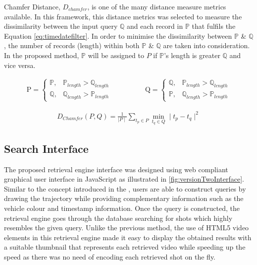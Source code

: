 Chamfer Distance, $D_{chamfer}$, is one of the many distance measure metrics available. In this framework, this distance metrics was selected to measure the dissimilarity between the input query $\mathbb{Q}$ and each record in $\mathbb{P}$ that fulfils the Equation \ref{eq:timedatefilter}. In order to minimise the dissimilarity between $\mathbb{P}$ \& $\mathbb{Q}$, the number of records (length) within both $\mathbb{P}$ \& $\mathbb{Q}$ are taken into consideration. In the proposed method, $\mathbb{P}$ will be assigned to $P$ if $\mathbb{P}$'s length is greater $\mathbb{Q}$ and vice versa.


\begin{align}
\mathrm{P} =\begin{cases}
\mathbb{P}, & \mathbb{P}_{length} > \mathbb{Q}_{length} \\
\mathbb{Q}, & \mathbb{Q}_{length} > \mathbb{P}_{length}
\end{cases}   \hspace{2em}  &  \hspace{2em}
\mathrm{Q} =\begin{cases}
\mathbb{Q}, & \mathbb{P}_{length} > \mathbb{Q}_{length} \\
\mathbb{P}, & \mathbb{Q}_{length} > \mathbb{P}_{length}
\end{cases}
\end{align}



\begin{align}
\label{eq:chamferDistance}
D_{Chamfer} (P,Q) = \frac{1}{\mid P \mid} \sum_{t_p \in P} \min_{t_q \in Q}  \mid t_p - t_q \mid^{2}
\end{align}

\subsection{Search Interface}
The proposed retrieval engine interface was designed using web compliant graphical user interface in JavaScript as illustrated in \ref{fig:versionTwoInterface}.
Similar to the concept introduced in the \versionOneRet, users are able to construct queries by drawing the trajectory while providing complementary information such as the vehicle colour and timestamp information.
Once the query is constructed, the retrieval engine goes through the database searching for shots which highly resembles the given query.
Unlike the previous method, the use of HTML5 video elements in this retrieval engine made it easy to display the obtained results with a suitable thumbnail that represents each retrieved video while speeding up the speed as there was no need of encoding each retrieved shot on the fly.

